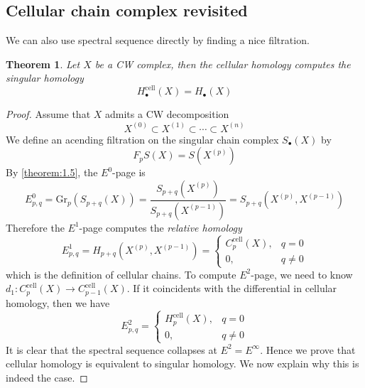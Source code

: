 \documentclass[a4paper,11pt]{article}
\newtheorem{theorem}{Theorem}[section]
\theoremstyle{definition}
\theoremstyle{remark}
\begin{document}
\subsection{Cellular chain complex revisited}
We can also use spectral sequence directly by finding a nice filtration.
\begin{theorem}
   Let $X$ be a CW complex, then the cellular homology computes the singular homology
   \[
   H_\bullet^{\text{cell}}(X) = H_\bullet (X)
   \]
\end{theorem}
\begin{proof}
Assume that $X$ admits a CW decomposition
\[
X^{(0)}\subset X^{(1)}\subset\cdots\subset X^{(n)}
\]
We define an acending filtration on the singular chain complex $S_\bullet(X)$ by
\[
F_pS(X)=S(X^{(p)})
\]
By \cref{theorem:1.5}, the $E^0$-page is
\[
E_{p,q}^0=\mathrm{Gr}_p(S_{p+q}(X))=\frac{S_{p+q}(X^{(p)})}{S_{p+q}(X^{(p-1)})}=S_{p+q}(X^{(p)},X^{(p-1)})
\]
Therefore the $E^1$-page computes the {\itshape relative homology} \cite[\S2.1]{Hatcher}
\[
E_{p,q}^{1}={H}_{p+q}(X^{(p)},X^{(p-1)})=\begin{cases}C_{p}^{\text{cell}}(X),&q=0\\0,&q\neq0\end{cases}
\]
which is the definition of cellular chains. To compute $E^2$-page, we need to know $d_1: C^{\text{cell}}_p(X)\to C^{\text{cell}}_{p-1}(X)$. If it coincidents with the differential in cellular homology, then we have 
\[
E_{p,q}^{2}=\begin{cases}H_{p}^{\text{cell}}(X),&q=0\\0,&q\neq0\end{cases}
\]
It is clear that the spectral sequence collapses at $E^2=E^\infty$. Hence we prove that cellular homology is equivalent to singular homology. We now explain why this is indeed the case.


\end{proof}
\end{document}
